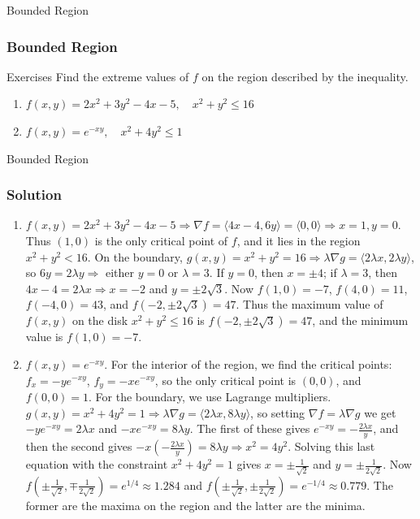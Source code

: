 \documentclass[aspectratio=169, UTF8]{beamer}
\begin{document}
\begin{frame}{Bounded Region}
    \frametitle{Bounded Region}
    \begin{block}{Exercises}
        Find the extreme values of $f$ on the region described by the inequality.
        \begin{enumerate}
            \item $f(x, y) = 2x^2 + 3y^2 - 4x - 5, \quad x^2 + y^2 \le 16$
            \item $f(x, y) = e^{-xy}, \quad x^2 + 4y^2 \le 1$
        \end{enumerate}
    \end{block}
\end{frame}
\begin{frame}{Bounded Region}
    \frametitle{Solution}
    \begin{enumerate}
        \item $f(x, y) = 2x^2 + 3y^2 - 4x - 5 \Rightarrow \nabla f = \langle 4x - 4, 6y \rangle = \langle 0, 0 \rangle \Rightarrow x = 1, y = 0$. Thus $(1, 0)$ is the only critical point of $f$, and it lies in the region $x^2 + y^2 < 16$. On the boundary, $g(x, y) = x^2 + y^2 = 16 \Rightarrow \lambda \nabla g = \langle 2\lambda x, 2\lambda y \rangle$, so $6y = 2\lambda y \Rightarrow$ either $y = 0$ or $\lambda = 3$. If $y = 0$, then $x = \pm 4$; if $\lambda = 3$, then $4x - 4 = 2\lambda x \Rightarrow x = -2$ and $y = \pm 2\sqrt{3}$. Now $f(1, 0) = -7$, $f(4, 0) = 11$, $f(-4, 0) = 43$, and $f(-2, \pm 2\sqrt{3}) = 47$. Thus the maximum value of $f(x, y)$ on the disk $x^2 + y^2 \le 16$ is $f(-2, \pm 2\sqrt{3}) = 47$, and the minimum value is $f(1, 0) = -7$.
        \item $f(x, y) = e^{-xy}$. For the interior of the region, we find the critical points: $f_x = -ye^{-xy}$, $f_y = -xe^{-xy}$, so the only critical point is $(0, 0)$, and $f(0, 0) = 1$. For the boundary, we use Lagrange multipliers. $g(x, y) = x^2 + 4y^2 = 1 \Rightarrow \lambda \nabla g = \langle 2\lambda x, 8\lambda y \rangle$, so setting $\nabla f = \lambda \nabla g$ we get $-ye^{-xy} = 2\lambda x$ and $-xe^{-xy} = 8\lambda y$. The first of these gives $e^{-xy} = -\frac{2\lambda x}{y}$, and then the second gives $-x(-\frac{2\lambda x}{y}) = 8\lambda y \Rightarrow x^2 = 4y^2$. Solving this last equation with the constraint $x^2 + 4y^2 = 1$ gives $x = \pm \frac{1}{\sqrt{2}}$ and $y = \pm \frac{1}{2\sqrt{2}}$. Now $f(\pm \frac{1}{\sqrt{2}}, \mp \frac{1}{2\sqrt{2}}) = e^{1/4} \approx 1.284$ and $f(\pm \frac{1}{\sqrt{2}}, \pm \frac{1}{2\sqrt{2}}) = e^{-1/4} \approx 0.779$. The former are the maxima on the region and the latter are the minima.
    \end{enumerate}
\end{frame}
\end{document}
